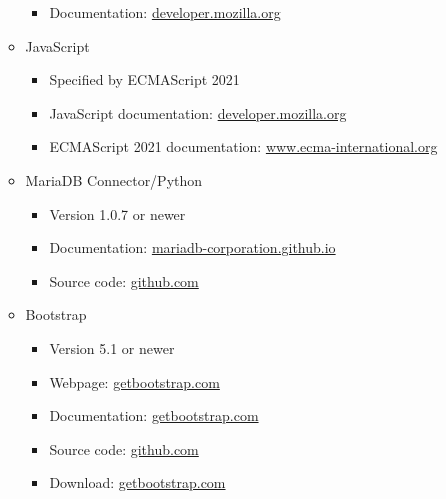 \documentclass{scrreprt}
\begin{document}
\begin{itemize}
\begin{itemize}
\begin{itemize}
            \item Documentation: \href{https://developer.mozilla.org/en-US/docs/Web/CSS}{developer.mozilla.org}
        
        \end{itemize}

        \item JavaScript
        \begin{itemize}

            \item Specified by ECMAScript 2021
            \item JavaScript documentation: \href{https://developer.mozilla.org/en-US/docs/Web/JavaScript}{developer.mozilla.org}
            \item ECMAScript 2021 documentation: \href{https://www.ecma-international.org/wp-content/uploads/ECMA-262_12th_edition_june_2021.pdf}{www.ecma-international.org}

        \end{itemize}

        \item MariaDB Connector/Python
        \begin{itemize}

            \item Version 1.0.7 or newer
            \item Documentation: \href{https://mariadb-corporation.github.io/mariadb-connector-python/}{mariadb-corporation.github.io}
            \item Source code: \href{https://github.com/mariadb-corporation/mariadb-connector-python}{github.com}

        \end{itemize}

        \item Bootstrap
        \begin{itemize}

            \item Version 5.1 or newer
            \item Webpage: \href{https://getbootstrap.com/}{getbootstrap.com}
            \item Documentation: \href{https://getbootstrap.com/docs/5.1/getting-started/introduction/}{getbootstrap.com}
            \item Source code: \href{https://github.com/twbs/bootstrap}{github.com}
            \item Download: \href{https://getbootstrap.com/docs/5.1/getting-started/download/}{getbootstrap.com}


\end{itemize}
\end{itemize}
\end{itemize}
\end{document}

